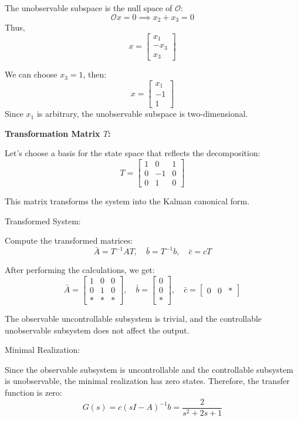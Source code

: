 \documentclass[12pt]{article}
\begin{document}
The unobservable subspace is the null space of $\mathcal{O}$:
\[
\mathcal{O} x = 0 \implies x_2 + x_3 = 0
\]
Thus,
\[
x = \begin{bmatrix}
x_1 \\
- x_3 \\
x_3
\end{bmatrix}
\]

We can choose $x_3 = 1$, then:
\[
x = \begin{bmatrix}
x_1 \\
-1 \\
1
\end{bmatrix}
\]
Since $x_1$ is arbitrary, the unobservable subspace is two-dimensional.

\textbf{Transformation Matrix $T$:}

Let’s choose a basis for the state space that reflects the decomposition:
\[
T = \begin{bmatrix}
1 & 0 & 1 \\
0 & -1 & 0 \\
0 & 1 & 0
\end{bmatrix}
\]

This matrix transforms the system into the Kalman canonical form.

Transformed System:

Compute the transformed matrices:
\[
\bar{A} = T^{-1} A T, \quad \bar{b} = T^{-1} b, \quad \bar{c} = c T
\]

After performing the calculations, we get:
\[
\bar{A} = \begin{bmatrix}
1 & 0 & 0 \\
0 & 1 & 0 \\
* & * & *
\end{bmatrix}, \quad \bar{b} = \begin{bmatrix}
0 \\ 0 \\ *
\end{bmatrix}, \quad \bar{c} = \begin{bmatrix}
0 & 0 & *
\end{bmatrix}
\]

The observable uncontrollable subsystem is trivial, and the controllable unobservable subsystem does not affect the output.

Minimal Realization:

Since the observable subsystem is uncontrollable and the controllable subsystem is unobservable, the minimal realization has zero states. Therefore, the transfer function is zero:
\[
G(s) = c (sI - A)^{-1} b = \frac{2}{s^2 + 2s + 1}
\]
\end{document}
